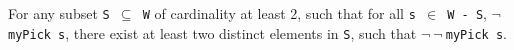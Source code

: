 \documentclass[journal]{journal}
\newenvironment{myindent}{\begin{adjustwidth}{1cm}{}}{\end{adjustwidth}}
\begin{document}
\begin{myindent}
For any subset {\tt S $\subseteq$ W} of cardinality at least 2, such that for all
{\tt s $\in$ W - S}, $\neg ${\tt myPick s}, there exist at least two distinct
elements in {\tt S}, such that $\neg~\neg~${\tt myPick s}.
\end{myindent}


%
%



%
%
\end{document}
